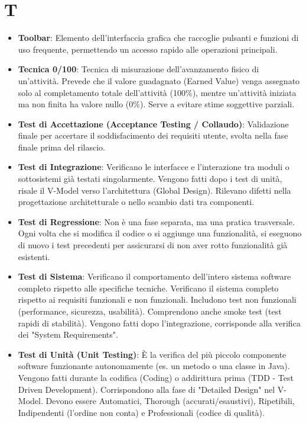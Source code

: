 \documentclass[11pt,a4paper]{article}
\begin{document}
\newpage

\section*{T}
\begin{itemize}

\item \textbf{Toolbar}: Elemento dell’interfaccia grafica che raccoglie pulsanti e funzioni di uso frequente, permettendo un accesso rapido alle operazioni principali.

\item \textbf{Tecnica 0/100}: Tecnica di misurazione dell'avanzamento fisico di un'attività. Prevede che il valore guadagnato (Earned Value) venga assegnato solo al completamento totale dell'attività (100\%), mentre un'attività iniziata ma non finita ha valore nullo (0\%). Serve a evitare stime soggettive parziali.

\item \textbf{Test di Accettazione (Acceptance Testing / Collaudo)}: Validazione finale per accertare il soddisfacimento dei requisiti utente, svolta nella fase finale prima del rilascio.

\item \textbf{Test di Integrazione}: Verificano le interfacce e l'interazione tra moduli o sottosistemi già testati singolarmente. Vengono fatti dopo i test di unità, risale il V-Model verso l'architettura (Global Design). Rilevano difetti nella progettazione architetturale o nello scambio dati tra componenti.

\item \textbf{Test di Regressione}: Non è una fase separata, ma una pratica trasversale. Ogni volta che si modifica il codice o si aggiunge una funzionalità, si eseguono di nuovo i test precedenti per assicurarsi di non aver rotto funzionalità già esistenti.

\item \textbf{Test di Sistema}: Verificano il comportamento dell'intero sistema software completo rispetto alle specifiche tecniche. Verificano il sistema completo rispetto ai requisiti funzionali e non funzionali. Includono test non funzionali (performance, sicurezza, usabilità). Comprendono anche smoke test (test rapidi di stabilità). Vengono fatti dopo l'integrazione, corrisponde alla verifica dei "System Requirements".

\item \textbf{Test di Unità (Unit Testing)}: È la verifica del più piccolo componente software funzionante autonomamente (es. un metodo o una classe in Java). Vengono fatti durante la codifica (Coding) o addirittura prima (TDD - Test Driven Development). Corrispondono alla fase di "Detailed Design" nel V-Model. Devono essere Automatici, Thorough (accurati/esaustivi), Ripetibili, Indipendenti (l'ordine non conta) e Professionali (codice di qualità).

\end{itemize}
\end{document}
